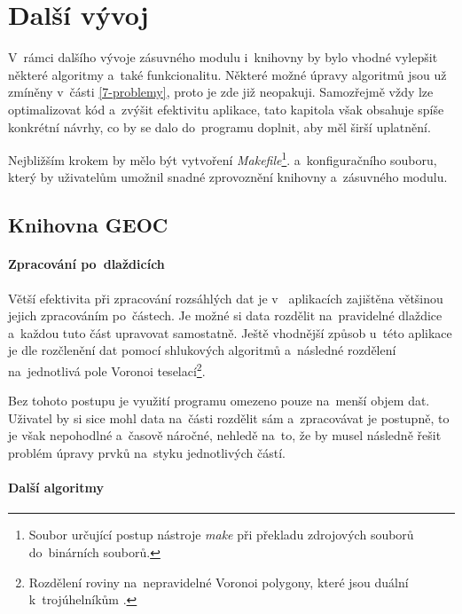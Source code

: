 \chapter{Další vývoj}
\label{8-vyvoj}

V~rámci dalšího vývoje zásuvného modulu i~knihovny 
by bylo vhodné vylepšit některé algoritmy a~také funkcionalitu.
Některé možné úpravy algoritmů jsou už zmíněny v~části 
\ref{7-problemy}, proto je zde již neopakuji. 
Samozřejmě vždy lze optimalizovat kód a~zvýšit efektivitu aplikace,
tato kapitola však obsahuje spíše konkrétní návrhy, co by se dalo 
do~programu doplnit, aby měl širší uplatnění.

Nejbližším krokem by mělo být vytvoření \textit{Makefile}\footnote{Soubor 
určující postup nástroje \textit{make} při překladu zdrojových
souborů do~binárních souborů.}. a~konfiguračního souboru, který by 
uživatelům umožnil snadné zprovoznění knihovny a~zásuvného modulu.

\section{Knihovna GEOC}
\label{geoc-vyvoj}

\subsubsection{Zpracování po~dlaždicích}
\label{dlazdice-vyvoj}

Větší efektivita při zpracování rozsáhlých dat je v~ 
aplikacích zajištěna většinou jejich zpracováním po~částech. Je možné
si data rozdělit na~pravidelné dlaždice a~každou tuto část upravovat
samostatně. Ještě vhodnější způsob u~této aplikace je dle \cite{freitas}
rozčlenění dat pomocí shlukových algoritmů a~následné rozdělení
na~jednotlivá pole Voronoi teselací\footnote{Rozdělení roviny 
na~nepravidelné Voronoi polygony, které jsou duální k~trojúhelníkům
.}.

Bez tohoto postupu je využití programu omezeno pouze na~menší objem
dat. Uživatel by si sice mohl data na~části rozdělit sám a~zpracovávat
je postupně, to je však nepohodlné a~časově náročné, nehledě na~to,
že by musel následně řešit problém úpravy prvků na~styku jednotlivých 
částí.


\subsubsection{Další algoritmy}
\label{dalsi-vyvoj}

